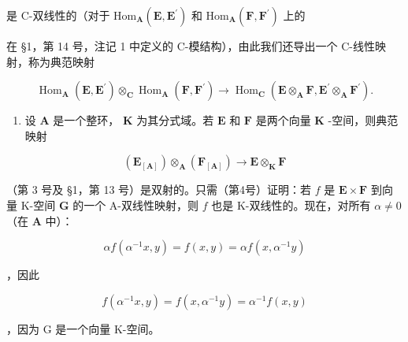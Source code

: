 是 C-双线性的（对于 \(\mathrm{Hom}_{\mathbf{A}}(\mathbf{E},\mathbf{E}^{\prime})\) 和 \(\mathrm{Hom}_{\mathbf{A}}(\mathbf{F},\mathbf{F}^{\prime})\) 上的

在 §1，第 14 号，注记 1 中定义的 C-模结构），由此我们还导出一个 C-线性映射，称为典范映射

\[
\operatorname{Hom} _ {\mathbf {A}} (\mathbf {E}, \mathbf {E} ^ {\prime}) \otimes_ {\mathbf {C}} \operatorname{Hom} _ {\mathbf {A}} (\mathbf {F}, \mathbf {F} ^ {\prime}) \rightarrow \operatorname{Hom} _ {\mathbf {C}} (\mathbf {E} \otimes_ {\mathbf {A}} \mathbf {F}, \mathbf {E} ^ {\prime} \otimes_ {\mathbf {A}} \mathbf {F} ^ {\prime}).\tag{13}
\]

\begin{enumerate}
\def\labelenumi{(\arabic{enumi})}
\setcounter{enumi}{2}
\tightlist
\item
  设 \(\mathbf{A}\) 是一个整环， \(\mathbf{K}\) 为其分式域。若 \(\mathbf{E}\) 和 \(\mathbf{F}\) 是两个向量 \(\mathbf{K}\) -空间，则典范映射
\end{enumerate}

\[
\left(\mathbf {E} _ {[ \mathbf {A} ]}\right) \otimes_ {\mathbf {A}} \left(\mathbf {F} _ {[ \mathbf {A} ]}\right)\rightarrow \mathbf {E} \otimes_ {\mathbf {K}} \mathbf {F}
\]

（第 3 号及 §1，第 13 号）是双射的。只需（第4号）证明：若 \(f\) 是 \(\mathbf{E} \times \mathbf{F}\) 到向量 K-空间 \(\mathbf{G}\) 的一个 A-双线性映射，则 \(f\) 也是 K-双线性的。现在，对所有 \(\alpha \neq 0\) （在 \(\mathbf{A}\) 中）：

\[
\alpha f (\alpha^ {- 1} x, y) = f (x, y) = \alpha f (x, \alpha^ {- 1} y)
\]

，因此

\[
f (\alpha^ {- 1} x, y) = f (x, \alpha^ {- 1} y) = \alpha^ {- 1} f (x, y)
\]

，因为 G 是一个向量 K-空间。

